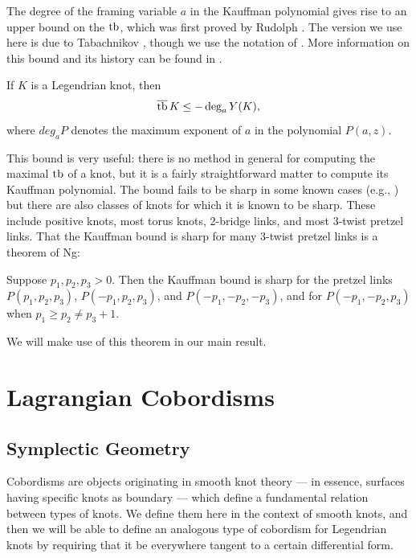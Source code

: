 The degree of the framing variable $a$ in the Kauffman polynomial gives rise to an upper bound on the $\operatorname{tb}$, which was first proved by Rudolph \cite{rudolph}. The version we use here is due to Tabachnikov \cite{tabachnikov}, though we use the notation of \cite{rutherford}. More information on this bound and its history can be found in \cite{ferrand}.

\begin{theorem}\label{kauffman-bound}
    If $K$ is a Legendrian knot, then 
    \[
        \overline{\operatorname{tb}}\, K \leq - \deg_a Y(K),
    \]
    where $deg_a P$ denotes the maximum exponent of $a$ in the polynomial $P(a, z)$.
\end{theorem}

This bound is very useful: there is no method in general for computing the maximal $\operatorname{tb}$ of a knot, but it is a fairly straightforward matter to compute its Kauffman polynomial. The bound fails to be sharp in some known cases (e.g., \cite{ferrand}) but there are also classes of knots for which it is known to be sharp. These include positive knots, most torus knots, 2-bridge links, and most 3-twist pretzel links. That the Kauffman bound is sharp for many 3-twist pretzel links is a theorem of Ng:

\begin{theorem}[\cite{ng}]\label{thm:ng}
    Suppose $p_1, p_2, p_3 > 0$. Then the Kauffman bound is sharp for the pretzel links $P(p_1, p_2, p_3)$, $P(-p_1, p_2, p_3)$, and $P(-p_1, -p_2, -p_3)$, and for $P(-p_1, -p_2, p_3)$ when $p_1 \geq p_2 \neq p_3 + 1$.
\end{theorem}

We will make use of this theorem in our main result.

\section{Lagrangian Cobordisms}\label{sec:cobordisms}

\subsection{Symplectic Geometry}\label{subsec:symplectic}

Cobordisms are objects originating in smooth knot theory --- in essence, surfaces having specific knots as boundary --- which define a fundamental relation between types of knots. We define them here in the context of smooth knots, and then we will be able to define an analogous type of cobordism for Legendrian knots by requiring that it be everywhere tangent to a certain differential form.

